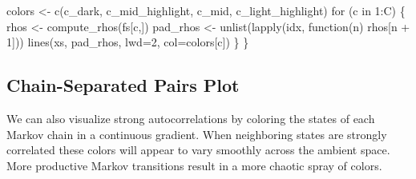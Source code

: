 \documentclass[
  letterpaper,
  DIV=11,
  numbers=noendperiod]{scrartcl}
\newenvironment{Shaded}{\begin{snugshade}}{\end{snugshade}}
\newcommand{\ControlFlowTok}[1]{\textcolor[rgb]{0.00,0.23,0.31}{#1}}
\newcommand{\DecValTok}[1]{\textcolor[rgb]{0.68,0.00,0.00}{#1}}
\newcommand{\KeywordTok}[1]{\textcolor[rgb]{0.00,0.23,0.31}{#1}}
\newcommand{\NormalTok}[1]{\textcolor[rgb]{0.00,0.23,0.31}{#1}}
\newcommand{\OperatorTok}[1]{\textcolor[rgb]{0.37,0.37,0.37}{#1}}
\begin{document}
\begin{Shaded}
\begin{Highlighting}[]
\NormalTok{  colors }\OperatorTok{\textless{}{-}}\NormalTok{ c(c\_dark, c\_mid\_highlight, c\_mid, c\_light\_highlight)}
  \ControlFlowTok{for}\NormalTok{ (c }\KeywordTok{in} \DecValTok{1}\NormalTok{:C) \{}
\NormalTok{    rhos }\OperatorTok{\textless{}{-}}\NormalTok{ compute\_rhos(fs[c,])}
\NormalTok{    pad\_rhos }\OperatorTok{\textless{}{-}}\NormalTok{ unlist(lapply(idx, function(n) rhos[n }\OperatorTok{+} \DecValTok{1}\NormalTok{]))}
\NormalTok{    lines(xs, pad\_rhos, lwd}\OperatorTok{=}\DecValTok{2}\NormalTok{, col}\OperatorTok{=}\NormalTok{colors[c])}
\NormalTok{  \}}
\NormalTok{\}}
\end{Highlighting}
\end{Shaded}

\subsection{Chain-Separated Pairs
Plot}\label{chain-separated-pairs-plot}

We can also visualize strong autocorrelations by coloring the states of
each Markov chain in a continuous gradient. When neighboring states are
strongly correlated these colors will appear to vary smoothly across the
ambient space. More productive Markov transitions result in a more
chaotic spray of colors.
\end{document}
